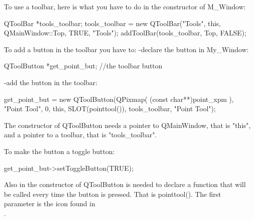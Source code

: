 To use a toolbar, here is what you have to do in the constructor of M\_Window:
\begin{ccExampleCode}
QToolBar  *tools_toolbar;
tools_toolbar = new QToolBar("Tools", this, QMainWindow::Top, TRUE, "Tools");
addToolBar(tools_toolbar, Top, FALSE);
\end{ccExampleCode}
To add a button in the toolbar you have to:
-declare the button in My\_Window:
\begin{ccExampleCode}
QToolButton *get_point_but;	//the toolbar button
\end{ccExampleCode}
-add the button in the toolbar:
\begin{ccExampleCode}
get_point_but =  new QToolButton(QPixmap( (const char**)point_xpm ),
                                         "Point Tool", 
                                         0, 
                                         this, 
                                         SLOT(pointtool()), 
                                         tools_toolbar, 
                                         "Point Tool");
\end{ccExampleCode}
The constructor of QToolButton needs a pointer to QMainWindow, that is
"this", and a pointer to a toolbar, that is "tools\_toolbar".

To make the button a toggle button:
\begin{ccExampleCode}
get_point_but->setToggleButton(TRUE);
\end{ccExampleCode}
Also in the constructor of QToolButton is needed to declare a function
that will be called every time the button is pressed. That is
pointtool(). The first parameter is the icon found in\\
 .







